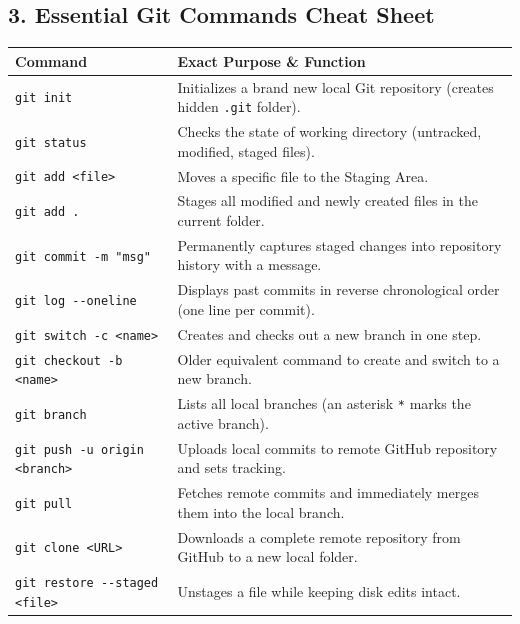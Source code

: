 \documentclass[a4paper,11pt]{article}
\begin{document}
\subsection{3. Essential Git Commands Cheat Sheet}
\begin{center}
\small
\renewcommand{\arraystretch}{1.25}
\begin{tabular}{@{}l p{10cm}@{}}
\toprule
\textbf{Command} & \textbf{Exact Purpose \& Function} \\
\midrule
\texttt{git init} & Initializes a brand new local Git repository (creates hidden \texttt{.git} folder). \\
\texttt{git status} & Checks the state of working directory (untracked, modified, staged files). \\
\texttt{git add <file>} & Moves a specific file to the Staging Area. \\
\texttt{git add .} & Stages all modified and newly created files in the current folder. \\
\texttt{git commit -m "msg"} & Permanently captures staged changes into repository history with a message. \\
\texttt{git log -{}-oneline} & Displays past commits in reverse chronological order (one line per commit). \\
\texttt{git switch -c <name>} & Creates and checks out a new branch in one step. \\
\texttt{git checkout -b <name>} & Older equivalent command to create and switch to a new branch. \\
\texttt{git branch} & Lists all local branches (an asterisk \texttt{*} marks the active branch). \\
\texttt{git push -u origin <branch>} & Uploads local commits to remote GitHub repository and sets tracking. \\
\texttt{git pull} & Fetches remote commits and immediately merges them into the local branch. \\
\texttt{git clone <URL>} & Downloads a complete remote repository from GitHub to a new local folder. \\
\texttt{git restore -{}-staged <file>} & Unstages a file while keeping disk edits intact. \\
\bottomrule
\end{tabular}
\end{center}
\end{document}

